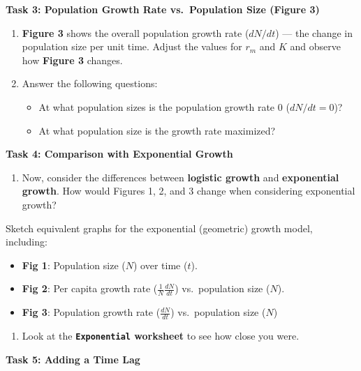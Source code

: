\documentclass[
  a4paper]{book}
\providecommand{\tightlist}{%
  \setlength{\itemsep}{0pt}\setlength{\parskip}{0pt}}
\begin{document}
\textbf{Task 3: Population Growth Rate vs.~Population Size (Figure 3)}

\begin{enumerate}
\def\labelenumi{\arabic{enumi}.}
\item
  \textbf{Figure 3} shows the overall population growth rate (\(dN/dt\)) --- the change in population size per unit time. Adjust the values for \(r_m\) and \(K\) and observe how \textbf{Figure 3} changes.
\item
  Answer the following questions:

  \begin{itemize}
  \tightlist
  \item
    At what population sizes is the population growth rate 0 (\(dN/dt = 0\))?
  \item
    At what population size is the growth rate maximized?
  \end{itemize}
\end{enumerate}

\textbf{Task 4: Comparison with Exponential Growth}

\begin{enumerate}
\def\labelenumi{\arabic{enumi}.}
\tightlist
\item
  Now, consider the differences between \textbf{logistic growth} and \textbf{exponential growth}. How would Figures 1, 2, and 3 change when considering exponential growth?
\end{enumerate}

Sketch equivalent graphs for the exponential (geometric) growth model, including:

\begin{itemize}
\tightlist
\item
  \textbf{Fig 1}: Population size (\(N\)) over time (\(t\)).
\item
  \textbf{Fig 2}: Per capita growth rate (\(\frac{1}{N} \frac{dN}{dt}\)) vs.~population size (\(N\)).
\item
  \textbf{Fig 3}: Population growth rate (\(\frac{dN}{dt}\)) vs.~population size (\(N\))
\end{itemize}

\begin{enumerate}
\def\labelenumi{\arabic{enumi}.}
\setcounter{enumi}{1}
\tightlist
\item
  Look at the \textbf{\texttt{Exponential} worksheet} to see how close you were.
\end{enumerate}

\textbf{Task 5: Adding a Time Lag}
\end{document}
